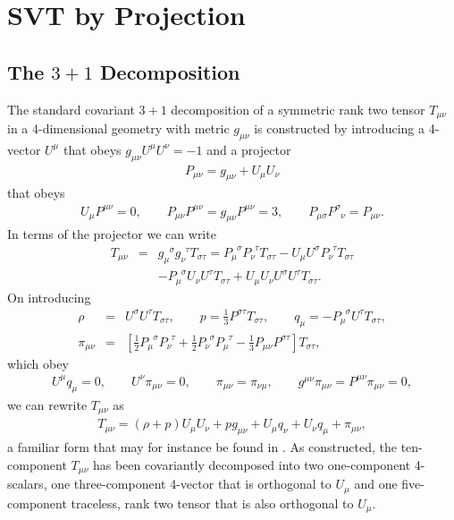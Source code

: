 
\chapter{SVT by Projection}
\label{aa:svt_projection}

\section{The $3+1$ Decomposition}
\label{aas:3_1_decomp}

The standard covariant $3+1$ decomposition of a symmetric rank two tensor $T_{\mu\nu}$ in a 4-dimensional geometry with metric $g_{\mu\nu}$ is constructed by introducing a 4-vector $U^{\mu}$ that obeys $g_{\mu\nu}U^{\mu}U^{\nu}=-1$ and a projector 
%
\begin{eqnarray}
P_{\mu\nu}=g_{\mu\nu}+U_{\mu}U_{\nu}
\label{E1}
\end{eqnarray}
%
that obeys
%
\begin{eqnarray}
U_{\mu}P^{\mu\nu}=0, \qquad P_{\mu\nu}P^{\mu\nu}=g_{\mu\nu}P^{\mu\nu}=3,\qquad P_{\mu\sigma}P^{\sigma}_{\phantom{\sigma}\nu}=P_{\mu\nu}.
\label{E2}
\end{eqnarray}
%
In terms of the projector we can write
%
\begin{eqnarray}
T_{\mu\nu}&=&g_{\mu}^{\phantom{\mu}\sigma}g_{\nu}^{\phantom{\nu}\tau}T_{\sigma\tau}=
P_{\mu}^{\phantom{\mu}\sigma}P_{\nu}^{\phantom{\nu}\tau}T_{\sigma\tau}
-U_{\mu}U^{\sigma}P_{\nu}^{\phantom{\nu}\tau}T_{\sigma\tau}
\nonumber\\
&&
-P_{\mu}^{\phantom{\mu}\sigma}U_{\nu}U^{\tau}T_{\sigma\tau}
+U_{\mu}U_{\nu}U^{\sigma}U^{\tau}T_{\sigma\tau}.
\label{E3}
\end{eqnarray}
%
On introducing
%
\begin{eqnarray}
\rho&=&U^{\sigma}U^{\tau}T_{\sigma\tau},\qquad p=\frac{1}{3}P^{\sigma\tau}T_{\sigma\tau},\qquad 
q_{\mu}=-P_{\mu}^{\phantom{\mu}\sigma}U^{\tau}T_{\sigma\tau},
\nonumber\\
\pi_{\mu\nu}&=&\left[\frac{1}{2}P_{\mu}^{\phantom{\mu}\sigma}P_{\nu}^{\phantom{\nu}\tau}
+\frac{1}{2}P_{\nu}^{\phantom{\nu}\sigma}P_{\mu}^{\phantom{\mu}\tau}
-\frac{1}{3}P_{\mu\nu}P^{\sigma\tau}\right]T_{\sigma\tau},
\label{E4}
\end{eqnarray}
%
which obey
%
\begin{eqnarray}
U^{\mu}q_{\mu}=0,\qquad U^{\nu}\pi_{\mu\nu}=0,\qquad \pi_{\mu\nu}=\pi_{\nu\mu},\qquad g^{\mu\nu}\pi_{\mu\nu}=P^{\mu\nu}\pi_{\mu\nu}=0,
\label{E5}
\end{eqnarray}
%
we can rewrite $T_{\mu\nu}$ as
%
\begin{eqnarray}
T_{\mu\nu}=(\rho+p)U_{\mu}U_{\nu}+pg_{\mu\nu}+U_{\mu}q_{\nu}+U_{\nu}q_{\mu}+\pi_{\mu\nu},
\label{E6}
\end{eqnarray}
%
a familiar form that may for instance be found in \cite{ellis_maartens_maccallum_2009}. As constructed, the ten-component $T_{\mu\nu}$ has been covariantly decomposed into two one-component 4-scalars, one three-component  4-vector that is orthogonal to $U_{\mu}$ and one five-component traceless, rank two tensor that is also orthogonal  to $U_{\mu}$.

